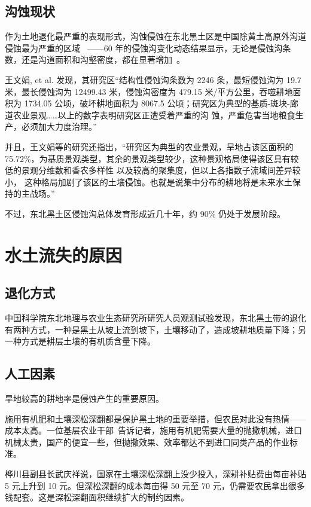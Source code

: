 \documentclass{nle}
\begin{document}
\subsection{沟蚀现状}

作为土地退化最严重的表现形式，沟蚀侵蚀在东北黑土区是中国除黄土高原外沟道侵蚀最为严重的区域 ~\cite{zhangxingyi:1}——60 年的侵蚀沟变化动态结果显示，无论是侵蚀沟条数，还是沟道面积和沟壑密度，都在显著增加~\cite{lizhiguang:1}。

王文娟, et al. 发现，其研究区“结构性侵蚀沟条数为 2246 条，最短侵蚀沟为 19.7 米，最长侵蚀沟为 12499.43 米，侵蚀沟密度为 479.15 米/平方公里，吞噬耕地面积为 1734.05 公顷，破坏耕地面积为 8067.5 公顷；研究区为典型的基质-斑块-廊道农业景观……以上的数字表明研究区正遭受着严重的沟 蚀，严重危害当地粮食生产，必须加大力度治理。”

并且，王文娟等的研究还指出，“研究区为典型的农业景观，旱地占该区面积的 75.72\%，为基质景观类型，其余的景观类型较少，这种景观格局使得该区具有较低的景观分维数和香农多样性 以及较高的聚集度，但以上各指数子流域间差异较小， 这种格局加剧了该区的土壤侵蚀。也就是说集中分布的耕地将是未来水土保持的主战场。”

不过，东北黑土区侵蚀沟总体发育形成近几十年，约 90\% 仍处于发展阶段。

\section{水土流失的原因}

\subsection{退化方式}
中国科学院东北地理与农业生态研究所研究人员观测试验发现，东北黑土带的退化有两种方式，一种是黑土从坡上流到坡下，土壤移动了，造成坡耕地质量下降；另一种方式是耕层土壤的有机质含量下降。

\subsection{人工因素}
旱地较高的耕地率是侵蚀产生的重要原因。

施用有机肥和土壤深松深翻都是保护黑土地的重要举措，但农民对此没有热情——成本太高。一位基层农业干部~\cite{official:1}告诉记者，施用有机肥需要大量的抛撒机械，进口机械太贵，国产的便宜一些，但抛撒效果、效率都达不到进口同类产品的作业标准。

桦川县副县长武庆祥说，国家在土壤深松深翻上没少投入，深耕补贴费由每亩补贴 5 元上升到 10 元。但深松深翻的成本每亩得 50 元至 70 元，仍需要农民拿出很多钱配套。这是深松深翻面积继续扩大的制约因素。
\end{document}
